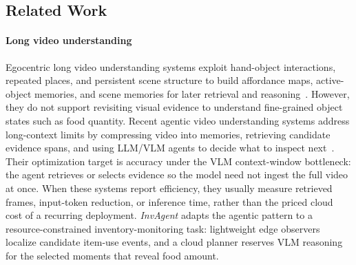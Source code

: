 \documentclass[sigconf,anonymous,nonacm]{acmart}
\newcommand{\scaffold}[1]{\textcolor{red}{#1}}
\newcommand{\sys}{\textit{InvAgent}\xspace}
\begin{document}

\subsection{Related Work}
\label{sec:bg-related}
\paragraph{Long video understanding}
Egocentric long video understanding systems exploit hand-object interactions, repeated places, and persistent scene structure to
build affordance maps, active-object memories, and scene
memories for later retrieval and reasoning~\cite{golettoAMEGOActiveMemory2024,nagarajan2020ego,price2022unweavenet,rodin2024action,fanEmbodiedVideoAgentPersistent2025, huang2025building,ramakrishnan2023naq,nagarajan2023egoenv}. However, they do not support revisiting visual evidence to understand fine-grained object states such as food quantity.
Recent agentic video understanding systems address long-context limits
by compressing video into memories, retrieving candidate evidence
spans, and using LLM/VLM agents to decide what to inspect
next~\cite{fanVideoAgentMemoryAugmentedMultimodal2025,wang2025active,
yan2025ava,zhang2025deep,rege2026agentic, shen2026vgent,zhou2026reagent,zuo2026videolucy}. Their optimization target is 
accuracy under the VLM context-window bottleneck: the agent retrieves
or selects evidence so the model need not ingest the full video at
once. When these systems report efficiency, they usually measure
retrieved frames, input-token reduction, or inference time, rather than
the priced cloud cost of a recurring deployment.
\sys adapts the agentic pattern to a resource-constrained
inventory-monitoring task: lightweight edge observers localize
candidate item-use events, and a cloud planner reserves VLM reasoning
for the selected moments that reveal food amount.
\end{document}
